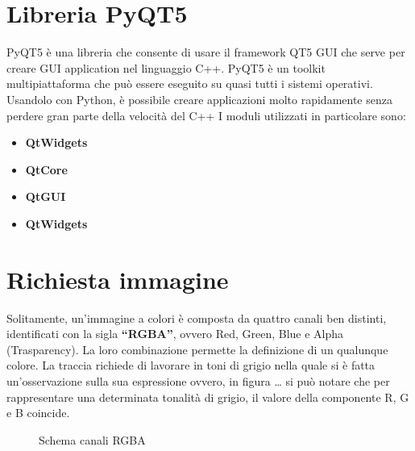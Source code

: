 \documentclass[12pt]{article}
\begin{document}
\section{Libreria PyQT5}

	PyQT5 è una libreria che consente di usare il framework QT5 GUI che serve per creare GUI application nel linguaggio C++.\newline
PyQT5 è un toolkit multipiattaforma che può essere eseguito su quasi tutti i sistemi operativi.\newline
Usandolo con Python, è possibile creare applicazioni molto rapidamente senza perdere gran parte della velocità del C++\newline
I moduli utilizzati in particolare sono:
	\begin{itemize}
		\item\textbf{QtWidgets} 
	 	\item\textbf{QtCore} 
	 	\item\textbf{QtGUI} 
	 	\item\textbf{QtWidgets} 
	\end{itemize}

\section{Richiesta immagine}
	Solitamente, un’immagine a colori è composta da quattro canali ben distinti, identificati con la sigla \textbf{“RGBA”}, ovvero Red, Green, Blue e Alpha (Trasparency).
La loro combinazione permette la definizione di un qualunque colore.\newline
La traccia richiede di lavorare in toni di grigio nella quale si è fatta un’osservazione sulla sua espressione ovvero, in figura … si può notare che per rappresentare una determinata tonalità di grigio, il valore della componente R, G e B coincide.
\begin{figure}[H]
    \caption{Schema canali RGBA}
    \label{fig:canali}
\end{figure}
	
\end{document}
